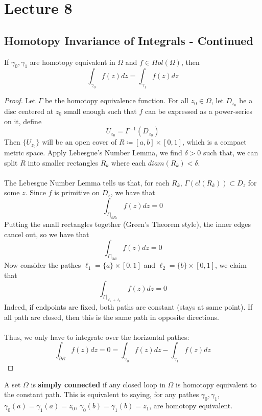 \section{Lecture 8}

\subsection{Homotopy Invariance of Integrals - Continued}

\begin{theorem}
If $\gamma_0, \gamma_1$ are homotopy equivalent in $\Omega$ and $f \in Hol(\Omega)$, then
\[\int_{\gamma_0} f(z) dz = \int_{\gamma_1} f(z) dz\]
\end{theorem}

\begin{proof}
Let $\Gamma$ be the homotopy equivalence function. For all $z_0 \in \Omega$, let $D_{z_0}$ be a disc centered at $z_0$ small enough such that $f$ can be expressed as a power-series on it, define
\[U_{z_0} = \Gamma^{-1}(D_{z_0})\]
Then $\{U_{z_0}\}$ will be an open cover of $R \coloneqq [a, b] \times [0, 1]$, which is a compact metric space. Apply Lebesgue's Number Lemma, we find $\delta > 0$ such that, we can split $R$ into smaller rectangles $R_k$ where each $diam(R_k) < \delta$.\\\\
The Lebesgue Number Lemma tells us that, for each $R_k$, $\Gamma(cl(R_k)) \subset D_{z}$ for some $z$. Since $f$ is primitive on $D_z$, we have that
\[\int_{\Gamma|_{\partial R_k}} f(z) dz = 0\]
Putting the small rectangles together (Green's Theorem style), the inner edges cancel out, so we have that
\[\int_{\Gamma|_{\partial R}} f(z) dz = 0\]
Now consider the pathes $\ell_1 = \{a\} \times [0, 1]$ and $\ell_2 = \{b\} \times [0, 1]$, we claim that
\[\int_{\Gamma|_{\ell_1 + \ell_2}} f(z) dz = 0\]
Indeed, if endpoints are fixed, both paths are constant (stays at same point). If all path are closed, then this is the same path in opposite directions.\\\\
Thus, we only have to integrate over the horizontal pathes:
\[\int_{\partial R} f(z) dz = 0 = \int_{\gamma_0} f(z) dz - \int_{\gamma_1} f(z) dz\]
\end{proof}

\begin{definition}
    A set $\Omega$ is \textbf{simply connected} if any closed loop in $\Omega$ is homotopy equivalent to the constant path. This is equivalent to saying, for any pathes $\gamma_0, \gamma_1$, $\gamma_0(a) = \gamma_1(a) = z_0$, $\gamma_0(b) = \gamma_1(b) = z_1$, are homotopy equivalent.
\end{definition}

